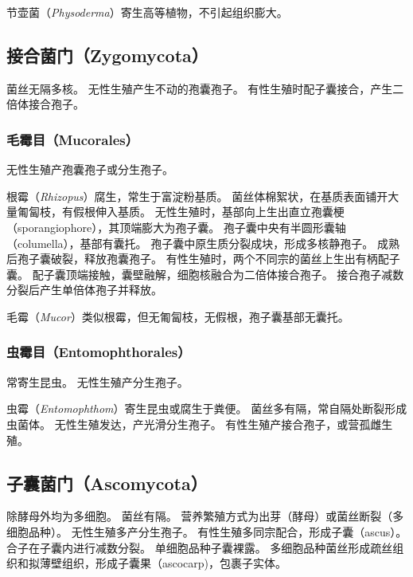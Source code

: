 \documentclass[11pt]{article}
\begin{document}
节壶菌（\textit{Physoderma}）寄生高等植物，不引起组织膨大。

\subsection{接合菌门（Zygomycota）}
菌丝无隔多核。
无性生殖产生不动的孢囊孢子。
有性生殖时配子囊接合，产生二倍体接合孢子。

\subsubsection{毛霉目（Mucorales）}
无性生殖产孢囊孢子或分生孢子。

\par

根霉（\textit{Rhizopus}）腐生，常生于富淀粉基质。
菌丝体棉絮状，在基质表面铺开大量匍匐枝，有假根伸入基质。
无性生殖时，基部向上生出直立孢囊梗（sporangiophore），其顶端膨大为孢子囊。
孢子囊中央有半圆形囊轴（columella），基部有囊托。
孢子囊中原生质分裂成块，形成多核静孢子。
成熟后孢子囊破裂，释放孢囊孢子。
有性生殖时，两个不同宗的菌丝上生出有柄配子囊。
配子囊顶端接触，囊壁融解，细胞核融合为二倍体接合孢子。
接合孢子减数分裂后产生单倍体孢子并释放。

\par

毛霉（\textit{Mucor}）类似根霉，但无匍匐枝，无假根，孢子囊基部无囊托。

\subsubsection{虫霉目（Entomophthorales）}
常寄生昆虫。
无性生殖产分生孢子。

\par

虫霉（\textit{Entomophthom}）寄生昆虫或腐生于粪便。
菌丝多有隔，常自隔处断裂形成虫菌体。
无性生殖发达，产光滑分生孢子。
有性生殖产接合孢子，或营孤雌生殖。

\subsection{子囊菌门（Ascomycota）}
除酵母外均为多细胞。
菌丝有隔。
营养繁殖方式为出芽（酵母）或菌丝断裂（多细胞品种）。
无性生殖多产分生孢子。
有性生殖多同宗配合，形成子囊（ascus）。
合子在子囊内进行减数分裂。
单细胞品种子囊裸露。
多细胞品种菌丝形成疏丝组织和拟薄壁组织，形成子囊果（ascocarp)，包裹子实体。

\par
\end{document}
